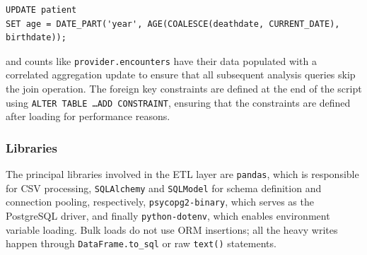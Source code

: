 \begin{lstlisting}[style=sqlstyle]
UPDATE patient
SET age = DATE_PART('year', AGE(COALESCE(deathdate, CURRENT_DATE), birthdate));
\end{lstlisting}

and counts like \texttt{provider.encounters} have their data populated with a correlated aggregation update to ensure that all subsequent analysis queries skip the join operation. The foreign key constraints are defined at the end of the script using \texttt{ALTER TABLE \dots ADD CONSTRAINT}, ensuring that the constraints are defined after loading for performance reasons.

\subsubsection*{Libraries}

The principal libraries involved in the ETL layer are \texttt{pandas}, which is responsible for CSV processing, \texttt{SQLAlchemy} and \texttt{SQLModel} for schema definition and connection pooling, respectively, \texttt{psycopg2-binary}, which serves as the PostgreSQL driver, and finally \texttt{python-dotenv}, which enables environment variable loading. Bulk loads do not use ORM insertions; all the heavy writes happen through \texttt{DataFrame.to\_sql} or raw \texttt{text()} statements.


